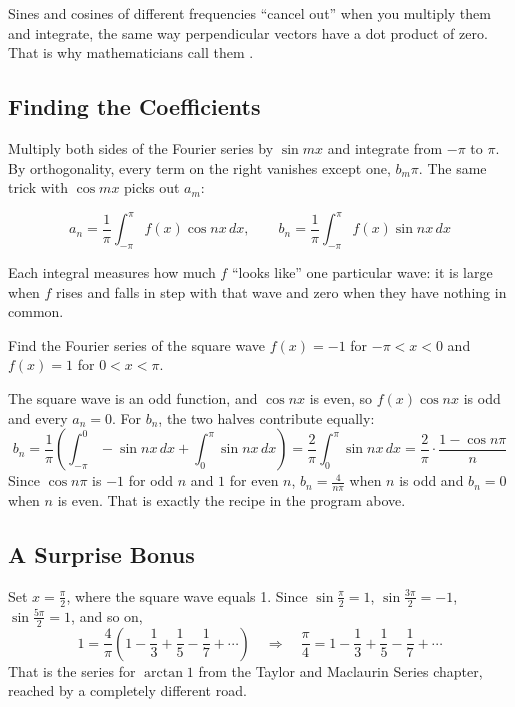 Sines and cosines of different frequencies ``cancel out'' when you multiply them
and integrate, the same way perpendicular vectors have a dot product of zero. That
is why mathematicians call them .

\subsection{Finding the Coefficients}
Multiply both sides of the Fourier series by $\sin mx$ and integrate from $-\pi$ to
$\pi$. By orthogonality, every term on the right vanishes except one, $b_m\pi$. The
same trick with $\cos mx$ picks out $a_m$:

\begin{mdframed}[style = important, frametitle = {Fourier Coefficients}]
$$a_n = \frac{1}{\pi}\int_{-\pi}^{\pi} f(x)\cos nx\,dx, \qquad b_n = \frac{1}{\pi}\int_{-\pi}^{\pi} f(x)\sin nx\,dx$$
\end{mdframed}

Each integral measures how much $f$ ``looks like'' one particular wave: it is large
when $f$ rises and falls in step with that wave and zero when they have nothing in
common.

\begin{Worked}
\begin{Problem}
Find the Fourier series of the square wave $f(x) = -1$ for
$-\pi < x < 0$ and $f(x) = 1$ for $0 < x < \pi$.
\end{Problem}
\begin{Solution}
The square wave is an odd function, and $\cos nx$ is even, so
$f(x)\cos nx$ is odd and every $a_n = 0$. For $b_n$, the two halves contribute
equally:
$$b_n = \frac{1}{\pi}\left(\int_{-\pi}^{0} -\sin nx\,dx + \int_{0}^{\pi} \sin nx\,dx\right) = \frac{2}{\pi}\int_0^\pi \sin nx\,dx = \frac{2}{\pi}\cdot\frac{1 - \cos n\pi}{n}$$
Since $\cos n\pi$ is $-1$ for odd $n$ and $1$ for even $n$, $b_n = \frac{4}{n\pi}$ when
$n$ is odd and $b_n = 0$ when $n$ is even. That is exactly the recipe in the
program above.
\end{Solution}
\end{Worked}

\subsection{A Surprise Bonus}
Set $x = \frac{\pi}{2}$, where the square wave equals 1. Since
$\sin\frac{\pi}{2} = 1$, $\sin\frac{3\pi}{2} = -1$, $\sin\frac{5\pi}{2} = 1$, and so on,
$$1 = \frac{4}{\pi}\left(1 - \frac{1}{3} + \frac{1}{5} - \frac{1}{7} + \cdots\right) \quad\Longrightarrow\quad \frac{\pi}{4} = 1 - \frac{1}{3} + \frac{1}{5} - \frac{1}{7} + \cdots$$
That is the series for $\arctan 1$ from the Taylor and Maclaurin Series chapter,
reached by a completely different road.

